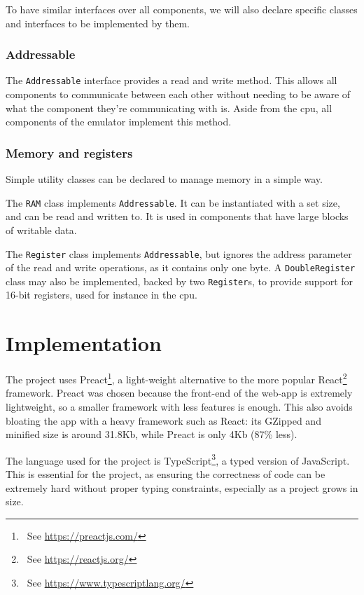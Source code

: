 \documentclass[11pt]{report}
\newcommand{\ftnt}[1]{\footnote{~See \url{#1}}}
\begin{document}
To have similar interfaces over all components, we will also declare specific classes and interfaces to be implemented by them.

\subsection{Addressable}

The \texttt{Addressable} interface provides a read and write method. This allows all components to communicate between each other without needing to be aware of what the component they're communicating with is. Aside from the \gls{cpu}, all components of the emulator implement this method.

\subsection{Memory and registers}

Simple utility classes can be declared to manage memory in a simple way.

The \texttt{RAM} class implements \texttt{Addressable}. It can be instantiated with a set size, and can be read and written to. It is used in components that have large blocks of writable data.

The \texttt{Register} class implements \texttt{Addressable}, but ignores the address parameter of the read and write operations, as it contains only one byte. A \texttt{DoubleRegister} class may also be implemented, backed by two \texttt{Register}s, to provide support for 16-bit registers, used for instance in the \gls{cpu}.

\chapter{Implementation}

The project uses Preact\ftnt{https://preactjs.com/}, a light-weight alternative to the more popular React\ftnt{https://reactjs.org/} framework. Preact was chosen because the front-end of the web-app is extremely lightweight, so a smaller framework with less features is enough. This also avoids bloating the app with a heavy framework such as React: its GZipped and minified size is around 31.8Kb, while Preact is only 4Kb (87\% less).

The language used for the project is TypeScript\ftnt{https://www.typescriptlang.org/}, a typed version of JavaScript. This is essential for the project, as ensuring the correctness of code can be extremely hard without proper typing constraints, especially as a project grows in size.
\end{document}
